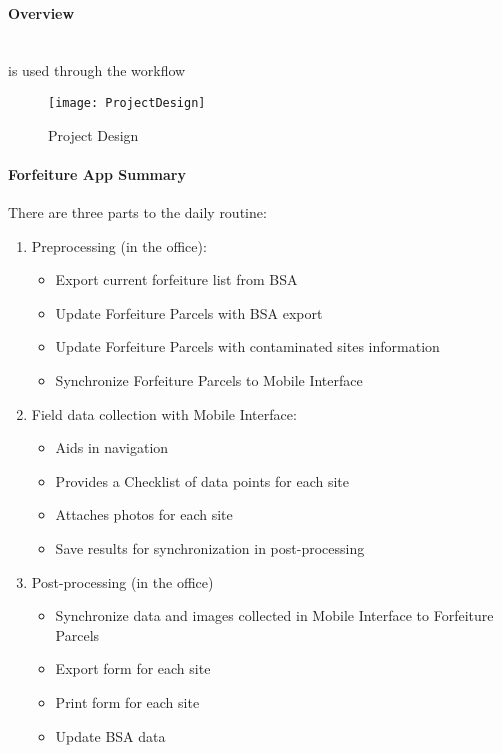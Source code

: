 \documentclass[class=book , crop=false, titlepage, twoside, multi={itemize, figure, verbatim}, float=false]{standalone}
\begin{document}
\paragraph[Overview]{Overview} {}\\
is used through the workflow

%
%
\begin{figure}[h!]
\centering
    \texttt{[image: ProjectDesign]}
\caption{Project Design}
\end{figure}
\clearpage
%
%
%
\paragraph{Forfeiture App Summary}
\vspace{.25in}

There are three parts to the daily routine:
\begin{enumerate}
\item \Large Preprocessing \normalsize(in the office):
%
\begin{itemize}
\item Export current forfeiture list from BSA
\item Update Forfeiture Parcels with BSA export
\item Update Forfeiture Parcels with contaminated sites information
\item Synchronize Forfeiture Parcels to Mobile Interface
\end{itemize}
%
\item \Large Field data collection \normalsize with Mobile Interface:
%
\begin{itemize}
\item Aids in navigation
\item Provides a Checklist of data points for each site
\item Attaches photos for each site
\item Save results for synchronization in post-processing
\end{itemize}
%
\item \Large Post-processing \normalsize (in the office)
%
\begin{itemize}
\item Synchronize data and images collected in Mobile Interface to Forfeiture Parcels
\item Export form for each site
\item Print form for each site
\item Update BSA data
%
\end{itemize}
%
\end{enumerate}
%
\clearpage
%
%
\end{document}
